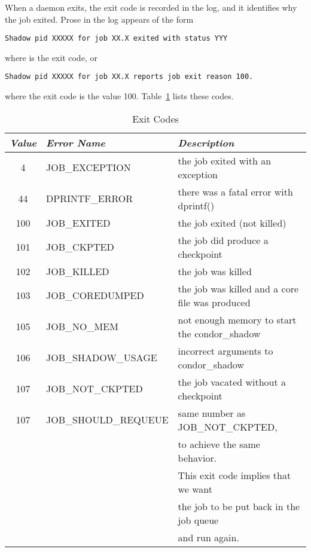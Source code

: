 
When a  daemon exits, 
the  exit code is recorded in the  log,
and it identifies why the job exited. 
Prose in the log appears of the form
\begin{verbatim}
Shadow pid XXXXX for job XX.X exited with status YYY 
\end{verbatim}
where  is the exit code,  or
\begin{verbatim}
Shadow pid XXXXX for job XX.X reports job exit reason 100. 
\end{verbatim}
where the exit code is the value 100.
Table~\ref{table:shadow-exit-codes} lists these codes.
\begin{center}
\begin{table}[H]
\caption{\label{table:shadow-exit-codes} Exit Codes}
\begin{tabular}{|c|l|l|} \hline
\emph{Value} & \emph{Error Name} & \emph{Description} \\ \hline \hline
4   &   JOB\_EXCEPTION    & the job exited with an exception \\ \hline
44  &   DPRINTF\_ERROR    & there was a fatal error with dprintf() \\ \hline
100 &   JOB\_EXITED       & the job exited (not killed)  \\ \hline
101 &   JOB\_CKPTED       & the job did produce a checkpoint  \\ \hline
102 &   JOB\_KILLED       & the job was killed     \\ \hline
103 &   JOB\_COREDUMPED   & the job was killed and a core file was produced  \\ \hline
105 &   JOB\_NO\_MEM      & not enough memory to start the condor\_shadow \\ \hline
106 &   JOB\_SHADOW\_USAGE & incorrect arguments to condor\_shadow \\ \hline
107 &   JOB\_NOT\_CKPTED  & the job vacated without a checkpoint \\ \hline
107 &   JOB\_SHOULD\_REQUEUE  & same number as JOB\_NOT\_CKPTED, \\
    & &                       to achieve the same behavior.  \\
    & &                       This exit code implies that we want \\
    & &                       the job to be put back in the job queue \\
    & &                       and run again. \\ \hline

\end{tabular}
\end{table}
\end{center}
